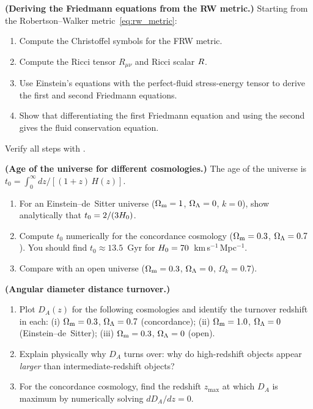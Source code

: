 \begin{exercise}
\label{ex:friedmann_derivation}
\textbf{(Deriving the Friedmann equations from the RW metric.)}
Starting from the Robertson--Walker metric~\eqref{eq:rw_metric}:
\begin{enumerate}[label=(\alph*)]
    \item Compute the Christoffel symbols for the FRW metric.
    \item Compute the Ricci tensor $R_{\mu\nu}$ and Ricci scalar $R$.
    \item Use Einstein's equations with the perfect-fluid
          stress-energy tensor to derive the first and second
          Friedmann equations.
    \item Show that differentiating the first Friedmann equation and
          using the second gives the fluid conservation equation.
\end{enumerate}
Verify all steps with
.
\end{exercise}

\begin{exercise}
\label{ex:age_of_universe}
\textbf{(Age of the universe for different cosmologies.)}
The age of the universe is
$t_0 = \int_0^\infty dz / [(1+z)\, H(z)]$.
\begin{enumerate}[label=(\alph*)]
    \item For an Einstein--de~Sitter universe ($\Omega_{\mathrm{m}} = 1$,
          $\Omega_{\Lambda} = 0$, $k = 0$), show analytically that
          $t_0 = 2/(3H_0)$.
    \item Compute $t_0$ numerically for the concordance cosmology
          ($\Omega_{\mathrm{m}} = 0.3$, $\Omega_{\Lambda} = 0.7$).  You should find
          $t_0 \approx 13.5$~Gyr for $H_0 = 70$~km\,s$^{-1}$\,Mpc$^{-1}$.
    \item Compare with an open universe ($\Omega_{\mathrm{m}} = 0.3$,
          $\Omega_{\Lambda} = 0$, $\Omega_k = 0.7$).
\end{enumerate}
\end{exercise}

\begin{exercise}
\label{ex:DA_turnover}
\textbf{(Angular diameter distance turnover.)}
\begin{enumerate}[label=(\alph*)]
    \item Plot $D_A(z)$ for the following cosmologies and identify the
          turnover redshift in each:
          (i) $\Omega_{\mathrm{m}} = 0.3$, $\Omega_{\Lambda} = 0.7$ (concordance);
          (ii) $\Omega_{\mathrm{m}} = 1.0$, $\Omega_{\Lambda} = 0$ (Einstein--de~Sitter);
          (iii) $\Omega_{\mathrm{m}} = 0.3$, $\Omega_{\Lambda} = 0$ (open).
    \item Explain physically why $D_A$ turns over: why do high-redshift
          objects appear \textit{larger} than intermediate-redshift objects?
    \item For the concordance cosmology, find the redshift $z_{\max}$
          at which $D_A$ is maximum by numerically solving
          $dD_A/dz = 0$.
\end{enumerate}
\end{exercise}

